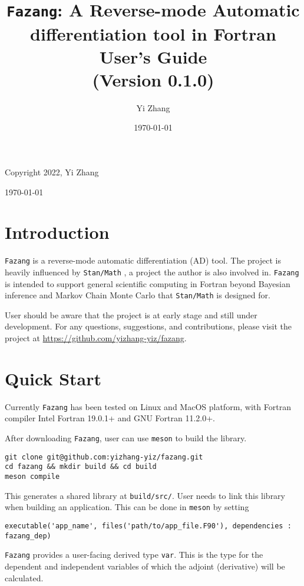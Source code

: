 \documentclass[12pt, reqno, oneside]{amsbook}
\author{Yi Zhang}
\date{\today}
\title{\texttt{Fazang}: A Reverse-mode Automatic differentiation tool in Fortran\\\medskip
\large User's Guide \\  (Version 0.1.0)}
\numberwithin{equation}{chapter}
\begin{document}
\begin{titlepage}
\maketitle
Copyright 2022, Yi Zhang
\newline
\newline
\newline

\today
\tableofcontents
\end{titlepage}

\chapter{Introduction}
\label{sec:orgb4421eb}
\texttt{Fazang} is a reverse-mode automatic differentiation (AD) tool. The
project is heavily influenced by \texttt{Stan/Math} \cite{Carpenter:2015}, a project the author
is also involved in. \texttt{Fazang} is intended to support general scientific
computing in Fortran beyond Bayesian inference and Markov Chain
Monte Carlo that \texttt{Stan/Math} is designed for. 

User should be aware that the project is at early stage and still
under development. For any questions, suggestions, and
contributions, please visit the project at \url{https://github.com/yizhang-yiz/fazang}.
\chapter{Quick Start}
\label{sec:orgcc6cf98}
Currently \texttt{Fazang} has been tested on Linux and MacOS platform, with
Fortran compiler Intel Fortran 19.0.1+ and GNU Fortran 11.2.0+.

After downloading \texttt{Fazang}, user can use \texttt{meson} to build the library.
\begin{verbatim}
git clone git@github.com:yizhang-yiz/fazang.git
cd fazang && mkdir build && cd build
meson compile
\end{verbatim}
This generates a shared library at \texttt{build/src/}. User needs to link
this library when building an application. This can be done in
\texttt{meson} by setting
\begin{verbatim}
executable('app_name', files('path/to/app_file.F90'), dependencies : fazang_dep)
\end{verbatim}

\texttt{Fazang} provides a user-facing derived type \texttt{var}. This is the
type for the dependent and independent variables of which the
adjoint (derivative) will be calculated.
\end{document}
